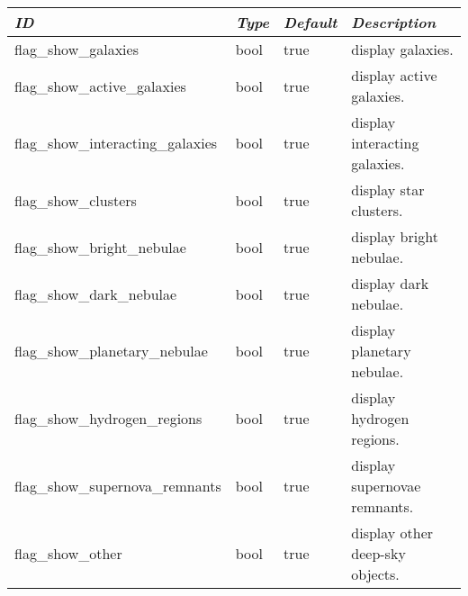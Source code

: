 \begin{longtabu} to \textwidth {l|l|l|X}\toprule
\emph{ID} & \emph{Type} & \emph{Default} & \emph{Description}\\\midrule
flag\_show\_galaxies              & bool & true & display galaxies.\\\midrule
flag\_show\_active\_galaxies      & bool & true & display active galaxies. \\\midrule
flag\_show\_interacting\_galaxies & bool & true & display interacting galaxies.  \\\midrule
flag\_show\_clusters              & bool & true & display star clusters.  \\\midrule
flag\_show\_bright\_nebulae       & bool & true & display bright nebulae.  \\\midrule
flag\_show\_dark\_nebulae         & bool & true & display dark nebulae.  \\\midrule
flag\_show\_planetary\_nebulae    & bool & true & display planetary nebulae.  \\\midrule
flag\_show\_hydrogen\_regions     & bool & true & display hydrogen regions. \\\midrule
flag\_show\_supernova\_remnants   & bool & true & display supernovae remnants. \\\midrule
flag\_show\_other                 & bool & true & display other deep-sky objects.  \\\bottomrule
\end{longtabu}

\section{}\label{sec:config.ini:gui}


